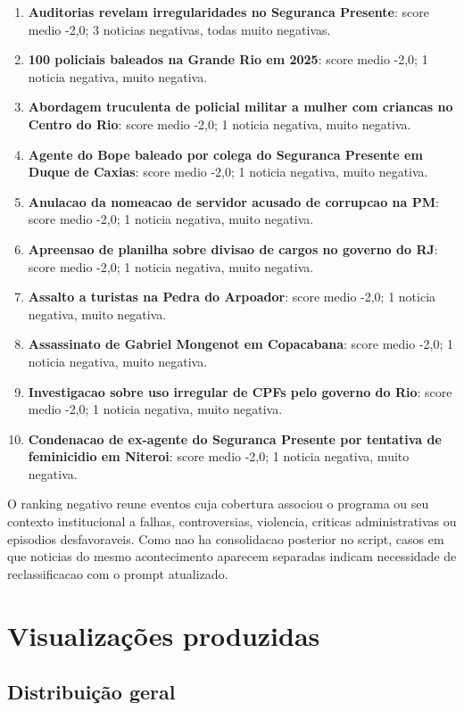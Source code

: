\documentclass[12pt,a4paper]{article}
\begin{document}
\begin{enumerate}
    \item \textbf{Auditorias revelam irregularidades no Seguranca Presente}: score medio -2,0; 3 noticias negativas, todas muito negativas.
    \item \textbf{100 policiais baleados na Grande Rio em 2025}: score medio -2,0; 1 noticia negativa, muito negativa.
    \item \textbf{Abordagem truculenta de policial militar a mulher com criancas no Centro do Rio}: score medio -2,0; 1 noticia negativa, muito negativa.
    \item \textbf{Agente do Bope baleado por colega do Seguranca Presente em Duque de Caxias}: score medio -2,0; 1 noticia negativa, muito negativa.
    \item \textbf{Anulacao da nomeacao de servidor acusado de corrupcao na PM}: score medio -2,0; 1 noticia negativa, muito negativa.
    \item \textbf{Apreensao de planilha sobre divisao de cargos no governo do RJ}: score medio -2,0; 1 noticia negativa, muito negativa.
    \item \textbf{Assalto a turistas na Pedra do Arpoador}: score medio -2,0; 1 noticia negativa, muito negativa.
    \item \textbf{Assassinato de Gabriel Mongenot em Copacabana}: score medio -2,0; 1 noticia negativa, muito negativa.
    \item \textbf{Investigacao sobre uso irregular de CPFs pelo governo do Rio}: score medio -2,0; 1 noticia negativa, muito negativa.
    \item \textbf{Condenacao de ex-agente do Seguranca Presente por tentativa de feminicidio em Niteroi}: score medio -2,0; 1 noticia negativa, muito negativa.
\end{enumerate}

O ranking negativo reune eventos cuja cobertura associou o programa ou seu contexto institucional a falhas, controversias, violencia, criticas administrativas ou episodios desfavoraveis. Como nao ha consolidacao posterior no script, casos em que noticias do mesmo acontecimento aparecem separadas indicam necessidade de reclassificacao com o prompt atualizado.

\section{Visualizações produzidas}

\subsection{Distribuição geral}
\end{document}
